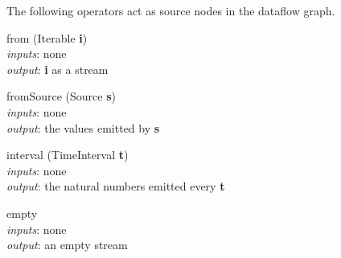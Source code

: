 \documentclass{dithesis}
\begin{document}
The following operators act as source nodes in the dataflow graph.
\begin{description}

\begin{minipage}[c]{\lll}
\item[from] (Iterable \textbf{i}) \\ 	
	\textit{inputs}: none \\
	\textit{output}: \textbf{i} as a stream \\
\end{minipage}
\hfill
\begin{minipage}[c]{\rrr}

\end{minipage}
\newline \newline \newline
\begin{minipage}[c]{\lll}
\item[fromSource](Source \textbf{s}) \\ 
	\textit{inputs}: none \\
	\textit{output}: the values emitted by \textbf{s} \\
\end{minipage}
\newline \newline \newline
\begin{minipage}[c]{\lll}
\item[interval](TimeInterval \textbf{t}) \\ 
	\textit{inputs}: none \\
	\textit{output}: the natural numbers emitted every \textbf{t} \newline \newline \newline
\end{minipage}
\hfill
\begin{minipage}[c]{\rrr}

\end{minipage}
\newline \newline \newline
\begin{minipage}[c]{\lll}
\item[empty] ~\\ 
	\textit{inputs}: none \\
	\textit{output}: an empty stream \\
\end{minipage}

\end{description}
\end{document}
